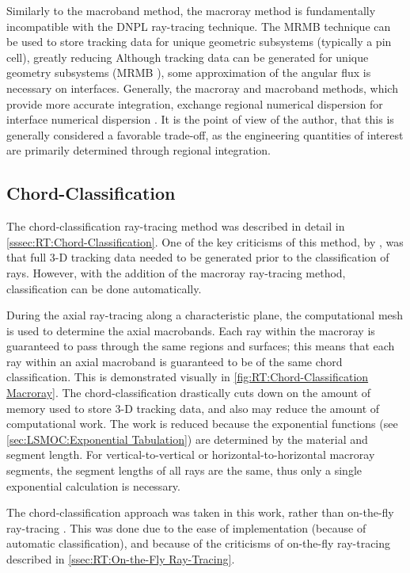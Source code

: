 {{    Similarly to the macroband method, the macroray method is fundamentally incompatible with the \ac{DNPL} ray-tracing technique.
    The \ac{MRMB} technique can be used to store tracking data for unique geometric subsystems (typically a pin cell), greatly reducing
    Although tracking data can be generated for unique geometry subsystems (\ac{MRMB} \cite{Yamamoto2005}), some approximation of the angular flux is necessary on interfaces.
    Generally, the macroray and macroband methods, which provide more accurate integration, exchange regional numerical dispersion for interface numerical dispersion \cite{Sanchez2012}.
    It is the point of view of the author, that this is generally considered a favorable trade-off, as the engineering quantities of interest are primarily determined through regional integration.

    \subsection{Chord-Classification}{\label{ssec:MR:Chord-Classification}
      The chord-classification ray-tracing method \cite{Sciannandrone2016} was described in detail in \cref{sssec:RT:Chord-Classification}.
      One of the key criticisms of this method, by \citet{Gunow2018}, was that full 3-D tracking data needed to be generated prior to the classification of rays.
      However, with the addition of the macroray ray-tracing method, classification can be done automatically.

      During the axial ray-tracing along a characteristic plane, the computational mesh is used to determine the axial macrobands.
      Each ray within the macroray is guaranteed to pass through the same regions and surfaces; this means that each ray within an axial macroband is guaranteed to be of the same chord classification.
      This is demonstrated visually in \cref{fig:RT:Chord-Classification Macroray}.
      The chord-classification drastically cuts down on the amount of memory used to store 3-D tracking data, and also may reduce the amount of computational work.
      The work is reduced because the exponential functions (see \cref{sec:LSMOC:Exponential Tabulation}) are determined by the material and segment length.
      For vertical-to-vertical or horizontal-to-horizontal macroray segments, the segment lengths of all rays are the same, thus only a single exponential calculation is necessary.

      The chord-classification approach was taken in this work, rather than on-the-fly ray-tracing \cite{Gunow2018}.
      This was done due to the ease of implementation (because of automatic classification), and because of the criticisms of on-the-fly ray-tracing described in \cref{ssec:RT:On-the-Fly Ray-Tracing}.

}}}
